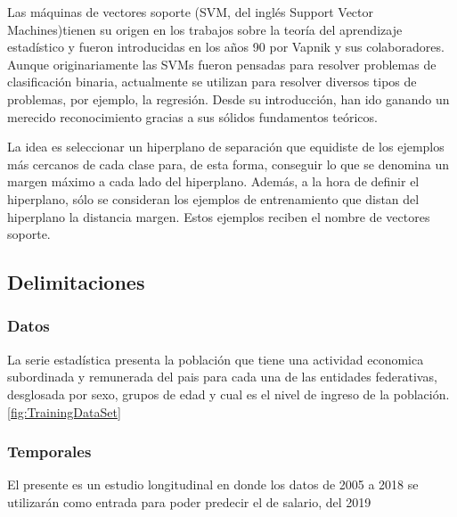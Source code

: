 Las m\'aquinas de vectores soporte (SVM, del ingl\'es Support Vector Machines)tienen su origen en los trabajos sobre la teor\'ia del aprendizaje estad\'istico y fueron introducidas en los años 90 por Vapnik y sus colaboradores. Aunque originariamente las SVMs fueron pensadas para resolver problemas de clasificaci\'on binaria, actualmente se utilizan para resolver diversos tipos de problemas, por ejemplo, la regresi\'on. Desde su introducci\'on, han ido ganando un merecido reconocimiento gracias a sus s\'olidos fundamentos te\'oricos.

La idea es seleccionar un hiperplano de separaci\'on que equidiste de los ejemplos m\'as cercanos de cada clase para, de esta forma, conseguir lo que se denomina un margen m\'aximo a cada lado del hiperplano. Adem\'as, a la hora de definir el hiperplano, s\'olo se consideran los ejemplos de entrenamiento que distan del hiperplano la distancia margen. Estos ejemplos reciben el nombre de vectores soporte.



\subsection{Delimitaciones}
\subsubsection{Datos}
La serie estad\'istica presenta la poblaci\'on que tiene una actividad economica subordinada y remunerada del pais para cada una de las entidades federativas, desglosada por sexo, grupos de edad y cual es el nivel de ingreso de la poblaci\'on.\ref{fig:TrainingDataSet}\cite{datosAbiertos_2019}
\subsubsection{Temporales}
El presente es un estudio longitudinal en donde los datos de 2005 a 2018 se utilizar\'an como entrada para poder predecir el de salario, del 2019

